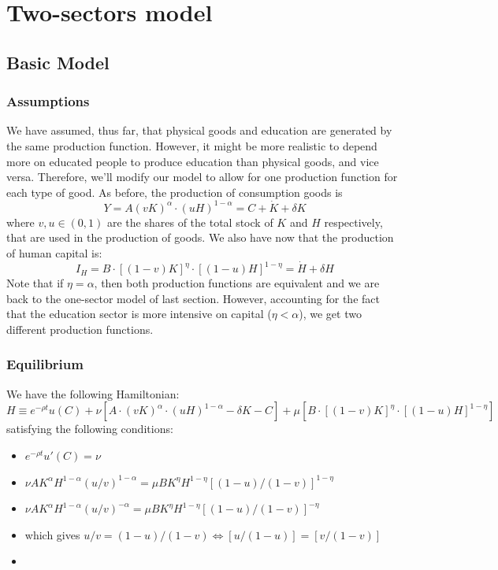 \documentclass[12pt]{report}
\begin{document}
\section{Two-sectors model}

\subsection{Basic Model}

\subsubsection{Assumptions}

We have assumed, thus far, that physical goods and education are generated by the same production function. However, it might be more realistic to depend more on educated people to produce education than physical goods, and vice versa. Therefore, we'll modify our model to allow for one production function for each type of good. As before, the production of consumption goods is $$ Y = A(vK)^{\alpha}\cdot(uH)^{1-\alpha} = C + \dot K + \delta K $$ where $v,u\in (0,1)$ are the shares of the total stock of $K$ and $H$ respectively, that are used in the production of goods. We also have now that the production of human capital is: $$I_H = B\cdot[(1-v)K]^\eta \cdot [(1-u)H]^{1-\eta} = \dot H + \delta H$$ Note that if $\eta = \alpha$, then both production functions are equivalent and we are back to the one-sector model of last section. However, accounting for the fact that the education sector is more intensive on capital ($\eta < \alpha$), we get two different production functions.

\subsubsection{Equilibrium}

We have the following Hamiltonian: $$ H\equiv e^{-\rho t} u(C) + \nu [ A\cdot (vK)^\alpha \cdot (uH)^{1-\alpha} - \delta K - C] + \mu [B\cdot[(1-v)K]^\eta \cdot [(1-u)H]^{1-\eta}] $$ satisfying the following conditions:\begin{itemize}
\item $e^{-\rho t} u'(C) = \nu$
\item $\nu A K^{\alpha}H^{1-\alpha} (u/v)^{1 - \alpha} = \mu B K^\eta H^{1-\eta} [(1-u)/(1-v)]^{1 - \eta} $
\item $\nu A K^{\alpha}H^{1-\alpha} (u/v)^{- \alpha} = \mu B K^\eta H^{1-\eta} [(1-u)/(1-v)]^{- \eta} $
\item[ ] which gives $ u/v = (1-u)/(1-v) \Leftrightarrow [u/(1-u)] = [v/(1-v)] $
\item 
\end{itemize}
\end{document}
